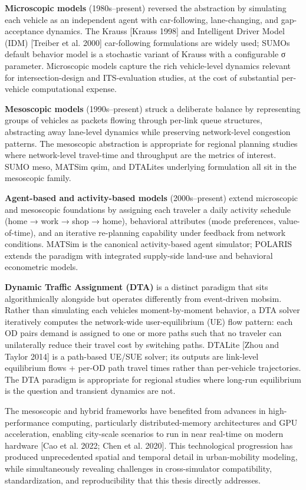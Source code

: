 \textbf{Microscopic models} (1980s--present) reversed the abstraction by
simulating each vehicle as an independent agent with car-following,
lane-changing, and gap-acceptance dynamics. The Krauss {[}Krauss 1998{]}
and Intelligent Driver Model (IDM) {[}Treiber et al. 2000{]}
car-following formulations are widely used; SUMO\textquotesingle s
default behavior model is a stochastic variant of Krauss with a
configurable σ parameter. Microscopic models capture the rich
vehicle-level dynamics relevant for intersection-design and
ITS-evaluation studies, at the cost of substantial per-vehicle
computational expense.

\textbf{Mesoscopic models} (1990s--present) struck a deliberate balance
by representing groups of vehicles as packets flowing through per-link
queue structures, abstracting away lane-level dynamics while preserving
network-level congestion patterns. The mesoscopic abstraction is
appropriate for regional planning studies where network-level
travel-time and throughput are the metrics of interest. SUMO meso,
MATSim qsim, and DTALite\textquotesingle s underlying formulation all
sit in the mesoscopic family.

\textbf{Agent-based and activity-based models} (2000s--present) extend
microscopic and mesoscopic foundations by assigning each traveler a
daily activity schedule (home → work → shop → home), behavioral
attributes (mode preferences, value-of-time), and an iterative
re-planning capability under feedback from network conditions. MATSim is
the canonical activity-based agent simulator; POLARIS extends the
paradigm with integrated supply-side land-use and behavioral econometric
models.

\textbf{Dynamic Traffic Assignment (DTA)} is a distinct paradigm that
sits algorithmically alongside but operates differently from
event-driven mobsim. Rather than simulating each
vehicle\textquotesingle s moment-by-moment behavior, a DTA solver
iteratively computes the network-wide user-equilibrium (UE) flow
pattern: each OD pair\textquotesingle s demand is assigned to one or
more paths such that no traveler can unilaterally reduce their travel
cost by switching paths. DTALite {[}Zhou and Taylor 2014{]} is a
path-based UE/SUE solver; its outputs are link-level equilibrium flows +
per-OD path travel times rather than per-vehicle trajectories. The DTA
paradigm is appropriate for regional studies where long-run equilibrium
is the question and transient dynamics are not.

The mesoscopic and hybrid frameworks have benefited from advances in
high-performance computing, particularly distributed-memory
architectures and GPU acceleration, enabling city-scale scenarios to run
in near real-time on modern hardware {[}Cao et al. 2022; Chen et al.
2020{]}. This technological progression has produced unprecedented
spatial and temporal detail in urban-mobility modeling, while
simultaneously revealing challenges in cross-simulator compatibility,
standardization, and reproducibility that this thesis directly
addresses.

